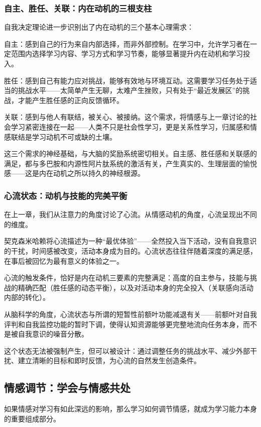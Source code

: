 \documentclass[11pt]{article}
\begin{document}
\subsubsection{自主、胜任、关联：内在动机的三根支柱}
\label{sec:org64d083c}

自我决定理论进一步识别出了内在动机的三个基本心理需求：

自主：感到自己的行为来自内部选择，而非外部控制。在学习中，允许学习者在一定范围内选择学习内容、学习方式和学习节奏，能够显著提升内在动机和学习投入。

胜任：感到自己有能力应对挑战，能够有效地与环境互动。这需要学习任务处于适当的挑战水平——太简单产生无聊，太难产生挫败，只有处于“最近发展区”的挑战，才能产生胜任感的正向反馈循环。

关联：感到与他人有联结，被关心、被接纳。这个需求，将情感与上一章讨论的社会学习紧密连接在一起——人类不只是社会性学习，更是关系性学习，归属感和情感联结是学习动机不可或缺的土壤。

这三个需求的神经基础，与大脑的奖励系统密切相关。自主感、胜任感和关联感的满足，都与多巴胺和内源性阿片肽系统的激活有关，产生真实的、生理层面的愉悦感——这是内在动机之所以持久的神经根源。
\subsubsection{心流状态：动机与技能的完美平衡}
\label{sec:org4c0910b}

在上一章，我们从注意力的角度讨论了心流。从情感动机的角度，心流呈现出不同的维度。

契克森米哈赖将心流描述为一种“最优体验”——全然投入当下活动，没有自我意识的干扰，时间感被改变，活动本身成为目的。心流状态往往伴随着深度的满足感，在事后被回忆为最有意义的体验之一。

心流的触发条件，恰好是内在动机三要素的完整满足：高度的自主参与，技能与挑战的精确匹配（胜任感的动态平衡），以及对活动本身的完全投入（关联感向活动内部的转化）。

从脑科学的角度，心流状态与所谓的短暂性前额叶功能减退有关——前额叶对自我评判和自我监控功能的暂时下调，使得认知资源能够更完整地流向任务本身，而不是被自我意识的噪音分散。

这个状态无法被强制产生，但可以被设计：通过调整任务的挑战水平、减少外部干扰、建立清晰的目标和即时反馈，为心流的自然发生创造条件。
\subsection{情感调节：学会与情感共处}
\label{sec:org10f8ff5}

如果情感对学习有如此深远的影响，那么学习如何调节情感，就成为学习能力本身的重要组成部分。
\end{document}
